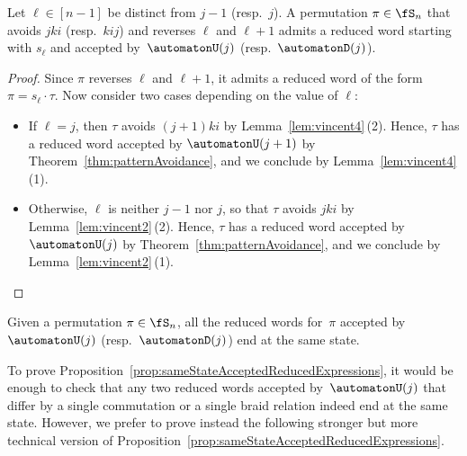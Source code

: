 \begin{proposition}\label{prop:algorithm}
Let $\ell \in [n-1]$ be distinct from $j-1$ (resp.~$j$).
A permutation $\pi \in \fS_n$ that avoids $jki$ (resp.~$kij$) and reverses $\ell$ and $\ell+1$ admits a reduced word starting with $s_\ell$ and accepted by~$\automatonU(j)$ (resp.~$\automatonD(j)$).
\end{proposition}

\begin{proof}
Since $\pi$ reverses $\ell$ and $\ell+1$, it admits a reduced word of the form~$\pi = s_\ell \cdot \tau$. Now consider two cases depending on the value of $\ell$:
\begin{itemize}
	\item If $\ell = j$, then $\tau$ avoids $(j+1)ki$ by Lemma~\ref{lem:vincent4}\,(2). Hence, $\tau$ has a reduced word accepted by $\automatonU(j+1)$ by Theorem~\ref{thm:patternAvoidance}, and we conclude by Lemma~\ref{lem:vincent4}\,(1).
	\item Otherwise, $\ell$ is neither $j-1$ nor $j$, so that $\tau$ avoids $jki$ by Lemma~\ref{lem:vincent2}\,(2). Hence, $\tau$ has a reduced word accepted by $\automatonU(j)$ by Theorem~\ref{thm:patternAvoidance}, and we conclude by Lemma~\ref{lem:vincent2}\,(1).
	\qedhere
\end{itemize}
\end{proof}

\begin{proposition}\label{prop:sameStateAcceptedReducedExpressions}
Given a permutation $\pi \in \fS_n$, all the reduced words for~$\pi$ accepted by $\automatonU(j)$ (resp.~$\automatonD(j)$) end at the same state.
\end{proposition}

To prove Proposition~\ref{prop:sameStateAcceptedReducedExpressions}, it would be enough to check that any two reduced words accepted by~$\automatonU(j)$ that differ by a single commutation or a single braid relation indeed end at the same state.
However, we prefer to prove instead the following stronger but more technical version of Proposition~\ref{prop:sameStateAcceptedReducedExpressions}.

